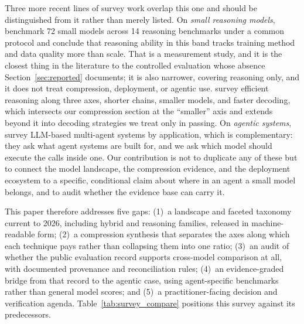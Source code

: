 Three more recent lines of survey work overlap this one and should be
distinguished from it rather than merely listed. On \emph{small reasoning
models}, \citet{srivastava2025thinkslm} benchmark 72 small models across 14
reasoning benchmarks under a common protocol and conclude that reasoning ability
in this band tracks training method and data quality more than scale. That is a
measurement study, and it is the closest thing in the literature to the
controlled evaluation whose absence Section~\ref{sec:reported} documents; it is
also narrower, covering reasoning only, and it does not treat compression,
deployment, or agentic use. \citet{feng2025efficient_reasoning_survey} survey
efficient reasoning along three axes, shorter chains, smaller models, and faster
decoding, which intersects our compression section at the ``smaller'' axis and
extends beyond it into decoding strategies we treat only in passing. On
\emph{agentic systems}, \citet{chen2024mas_survey} survey LLM-based multi-agent
systems by application, which is complementary: they ask what agent systems are
built for, and we ask which model should execute the calls inside one. Our
contribution is not to duplicate any of these but to connect the model landscape,
the compression evidence, and the deployment ecosystem to a specific, conditional
claim about where in an agent a small model belongs, and to audit whether the
evidence base can carry it.

This paper therefore addresses five gaps: (1)~a landscape and faceted taxonomy current to 2026, including hybrid and reasoning families, released in machine-readable form; (2)~a compression synthesis that separates the axes along which each technique pays rather than collapsing them into one ratio; (3)~an audit of whether the public evaluation record supports cross-model comparison at all, with documented provenance and reconciliation rules; (4)~an evidence-graded bridge from that record to the agentic case, using agent-specific benchmarks rather than general model scores; and (5)~a practitioner-facing decision and verification agenda. Table~\ref{tab:survey_compare} positions this survey against its predecessors.

